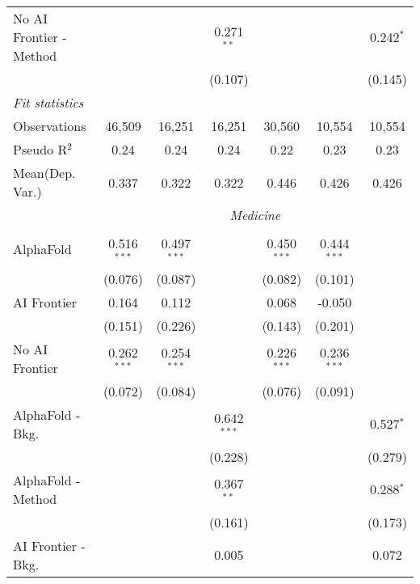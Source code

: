 \begin{tabular}{lcccccc}
   No AI Frontier - Method &               &              & 0.271$^{**}$  &               &              & 0.242$^{*}$\\   
                           &               &              & (0.107)       &               &              & (0.145)\\   
   \midrule
   \emph{Fit statistics}\\
   Observations            & 46,509        & 16,251       & 16,251        & 30,560        & 10,554       & 10,554\\  
   Pseudo R$^2$            & 0.24          & 0.24         & 0.24          & 0.22          & 0.23         & 0.23\\  
   
Mean(Dep. Var.) & 0.337 & 0.322 & 0.322 & 0.446 & 0.426 & 0.426 \\
 & \multicolumn{6}{c}{\textit{Medicine}} \\ \\
   AlphaFold               & 0.516$^{***}$ & 0.497$^{***}$ &               & 0.450$^{***}$ & 0.444$^{***}$ &   \\   
                           & (0.076)       & (0.087)       &               & (0.082)       & (0.101)       &   \\   
   AI Frontier             & 0.164         & 0.112         &               & 0.068         & -0.050        &   \\   
                           & (0.151)       & (0.226)       &               & (0.143)       & (0.201)       &   \\   
   No AI Frontier          & 0.262$^{***}$ & 0.254$^{***}$ &               & 0.226$^{***}$ & 0.236$^{***}$ &   \\   
                           & (0.072)       & (0.084)       &               & (0.076)       & (0.091)       &   \\   
   AlphaFold - Bkg.        &               &               & 0.642$^{***}$ &               &               & 0.527$^{*}$\\   
                           &               &               & (0.228)       &               &               & (0.279)\\   
   AlphaFold - Method      &               &               & 0.367$^{**}$  &               &               & 0.288$^{*}$\\   
                           &               &               & (0.161)       &               &               & (0.173)\\   
   AI Frontier - Bkg.      &               &               & 0.005         &               &               & 0.072\\   

\end{tabular}
